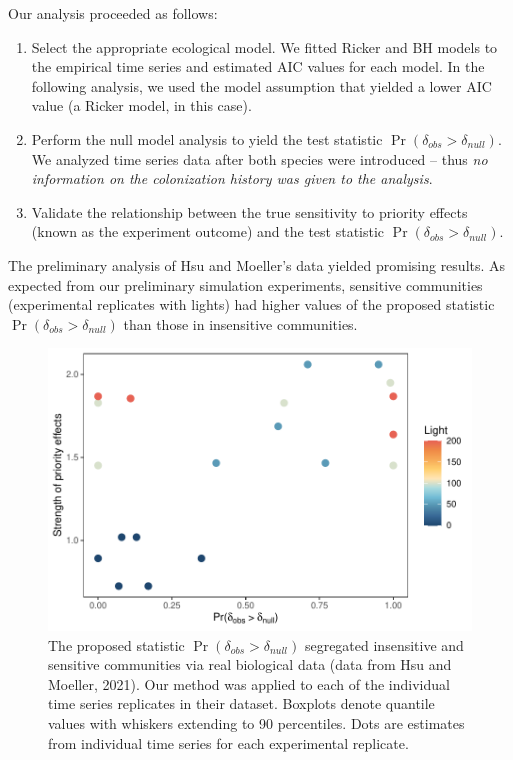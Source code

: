 \documentclass[12pt, class=article, crop=false]{standalone}
\begin{document}
Our analysis proceeded as follows:

\begin{enumerate}
    \item Select the appropriate ecological model.
    We fitted Ricker and BH models to the empirical time series and estimated AIC values for each model.
    In the following analysis, we used the model assumption that yielded a lower AIC value (a Ricker model, in this case).
    \item Perform the null model analysis to yield the test statistic $\Pr(\delta_{obs} > \delta_{null})$.
    We analyzed time series data after both species were introduced -- thus \textit{no information on the colonization history was given to the analysis}.
    \item Validate the relationship between the true sensitivity to priority effects (known as the experiment outcome) and the test statistic $\Pr(\delta_{obs} > \delta_{null})$.
\end{enumerate}

The preliminary analysis of Hsu and Moeller's data yielded promising results.
As expected from our preliminary simulation experiments, sensitive communities (experimental replicates with lights) had higher values of the proposed statistic $\Pr(\delta_{obs} > \delta_{null})$ than those in insensitive communities.

\begin{figure}
    \includegraphics[scale=0.5]{output/figure_scatter_hsu.pdf}
    \caption{The proposed statistic $\Pr({\delta_{obs} > \delta_{null}})$ segregated insensitive and sensitive communities via real biological data (data from Hsu and Moeller, 2021).
    Our method was applied to each of the individual time series replicates in their dataset.
    Boxplots denote quantile values with whiskers extending to 90 percentiles. 
    Dots are estimates from individual time series for each experimental replicate.}
    \label{fig:box_hsu}
\end{figure}
\end{document}
